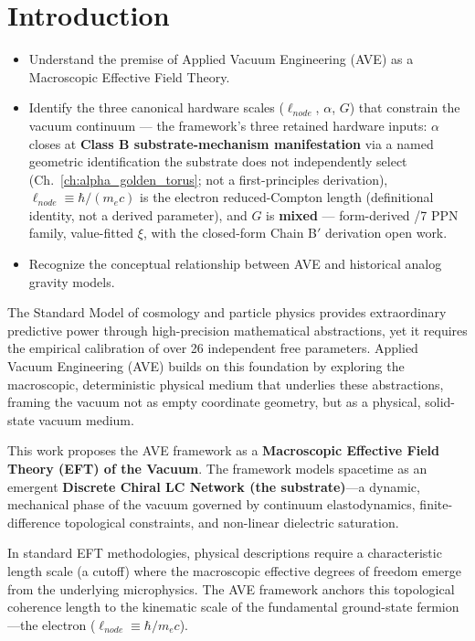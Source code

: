 \chapter*{Introduction}

\begin{objectivebox}
\begin{itemize}
    \item Understand the premise of Applied Vacuum Engineering (AVE) as a Macroscopic Effective Field Theory.
    \item Identify the three canonical hardware scales ($\ell_{node}$, $\alpha$, $G$) that constrain the vacuum continuum --- the framework's three retained hardware inputs: $\alpha$ closes at \textbf{Class B substrate-mechanism manifestation} via a named geometric identification the substrate does not independently select (Ch.~\ref{ch:alpha_golden_torus}; not a first-principles derivation), $\ell_{node} \equiv \hbar/(m_e c)$ is the electron reduced-Compton length (definitional identity, not a derived parameter), and $G$ is \textbf{mixed} --- form-derived /7 PPN family, value-fitted $\xi$, with the closed-form Chain B$'$ derivation open work.
    \item Recognize the conceptual relationship between AVE and historical analog gravity models.
\end{itemize}
\end{objectivebox}

The Standard Model of cosmology and particle physics provides extraordinary predictive power through high-precision mathematical abstractions, yet it requires the empirical calibration of over 26 independent free parameters. Applied Vacuum Engineering (AVE) builds on this foundation by exploring the macroscopic, deterministic physical medium that underlies these abstractions, framing the vacuum not as empty coordinate geometry, but as a physical, solid-state vacuum medium.

This work proposes the AVE framework as a \textbf{Macroscopic Effective Field Theory (EFT) of the Vacuum}. The framework models spacetime as an emergent \textbf{Discrete Chiral LC Network (the substrate)}---a dynamic, mechanical phase of the vacuum governed by continuum elastodynamics, finite-difference topological constraints, and non-linear dielectric saturation.

In standard EFT methodologies, physical descriptions require a characteristic length scale (a cutoff) where the macroscopic effective degrees of freedom emerge from the underlying microphysics. The AVE framework anchors this topological coherence length to the kinematic scale of the fundamental ground-state fermion---the electron ($\ell_{node} \equiv \hbar / m_e c$).

